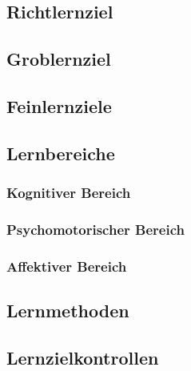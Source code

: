 \subsection{Richtlernziel}
\subsection{Groblernziel}
\subsection{Feinlernziele}
\subsection{Lernbereiche}
\subsubsection*{Kognitiver Bereich}
\subsubsection*{Psychomotorischer Bereich}
\subsubsection*{Affektiver Bereich}
\subsection{Lernmethoden}
\subsection{Lernzielkontrollen}